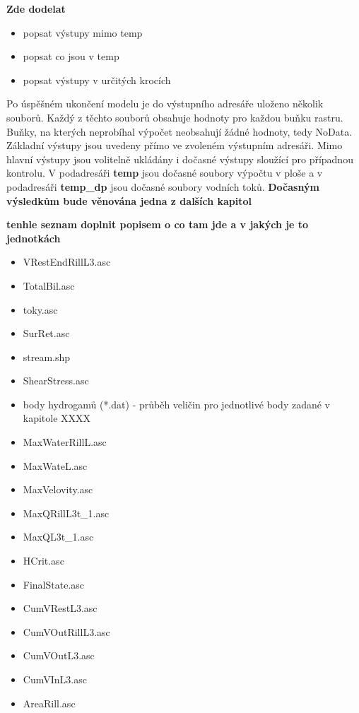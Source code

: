 \textbf{Zde dodelat}
\begin{itemize}
\item popsat výstupy mimo temp
\item popsat co jsou v temp
\item popsat výstupy v určitých krocích
\end{itemize}



Po úspěšném ukončení modelu je do výstupního adresáře uloženo několik souborů. Každý z těchto souborů obsahuje hodnoty pro každou buňku rastru. Buňky, na kterých neprobíhal výpočet neobsahují žádné hodnoty, tedy NoData. Základní výstupy jsou uvedeny přímo ve zvoleném výstupním adresáři. Mimo hlavní výstupy jsou volitelně ukládány i dočasné výstupy sloužící pro případnou kontrolu. V podadresáři \textbf{temp} jsou dočasné soubory výpočtu v ploše a v podadresáři \textbf{temp_dp} jsou dočasné soubory vodních toků. \textbf{Dočasným výsledkům bude věnována jedna z dalších kapitol}

\textbf{tenhle seznam doplnit popisem o co tam jde a v jakých je to jednotkách}
\begin{itemize}
\item VRestEndRillL3.asc
\item TotalBil.asc
\item toky.asc
\item SurRet.asc
\item stream.shp
\item ShearStress.asc
\item body hydrogamů (*.dat) - průběh veličin pro jednotlivé body zadané v kapitole XXXX
\item MaxWaterRillL.asc
\item MaxWateL.asc
\item MaxVelovity.asc
\item MaxQRillL3t_1.asc
\item MaxQL3t_1.asc
\item HCrit.asc
\item FinalState.asc
\item CumVRestL3.asc
\item CumVOutRillL3.asc
\item CumVOutL3.asc
\item CumVInL3.asc
\item AreaRill.asc
\end{itemize}

